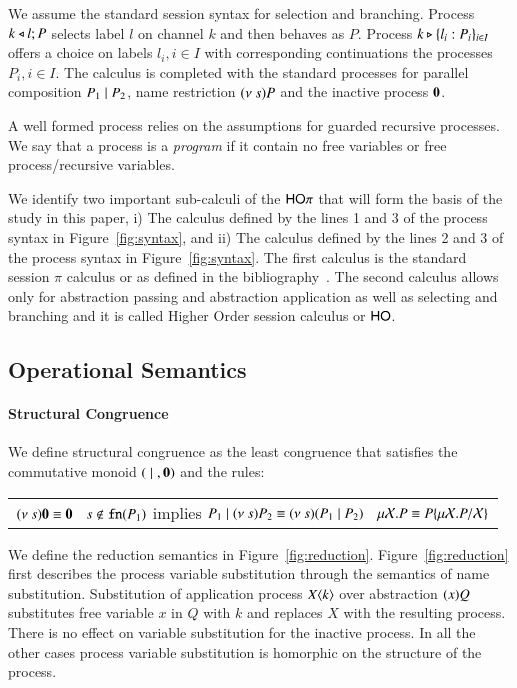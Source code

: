 We assume the standard session syntax for selection and branching. Process
$k \triangleleft l ; P$ selects label $l$ on channel $k$ and then behaves as $P$. Process 
$k \triangleright \{l_i:P_i\}_{i \in I}$ offers a choice on labels $l_i, i \in I$ with
corresponding continuations the processes $P_i, i \in I$.
The calculus is completed with the standard processes for parallel composition $P_1 \;|\; P_2$,
name restriction $(\nu\ s) P$ and the inactive process $\mathbf{0}$.

A well formed process relies on the assumptions for guarded recursive processes.
We say that a process is a \emph{program} if it contain 
no free variables or free process/recursive variables.



We identify two important sub-calculi of the $\mathsf{HO}\pi$ that will form
the basis of the study in this paper, i) The calculus defined by the lines 1 and 3 of the
process syntax in Figure~\ref{fig:syntax}, and ii) The calculus defined by the lines 2 and 3
of the process syntax in Figure~\ref{fig:syntax}. The first calculus is the standard
session $\pi$ calculus or \sesp as defined in the bibliography~\cite{}. The second
calculus allows only for abstraction passing and abstraction application as well 
as selecting and branching and it is called Higher Order session calculus or $\mathsf{HO}$.


\subsection{Operational Semantics}

\paragraph{Structural Congruence}

We define structural congruence as the least congruence that satisfies the commutative monoid $(\;|\;, \mathbf{0})$
and the rules:

\begin{tabular}{c}
	$(\nu\ s) \mathbf{0} \equiv \mathbf{0} \quad
	s \notin \mathtt{fn}(P_1)$ implies $P_1 \;|\; (\nu\ s) P_2 \equiv (\nu\ s)(P_1 \;|\; P_2)
	\quad \mu \mathcal{X}. P \equiv P\{\mu \mathcal{X}. P/\mathcal{X} \}$
\end{tabular}


We define the reduction semantics in Figure~\ref{fig:reduction}.
Figure~\ref{fig:reduction} first describes the process variable
substitution through the semantics
of name substitution. Substitution of application process $X\langle k \rangle$
over abstraction $(x)Q$ substitutes free variable
$x$ in $Q$ with $k$ and replaces $X$ with the resulting process.
There is no effect on variable substitution for the inactive process.
In all the other cases process variable substitution is homorphic 
on the structure of the process.

